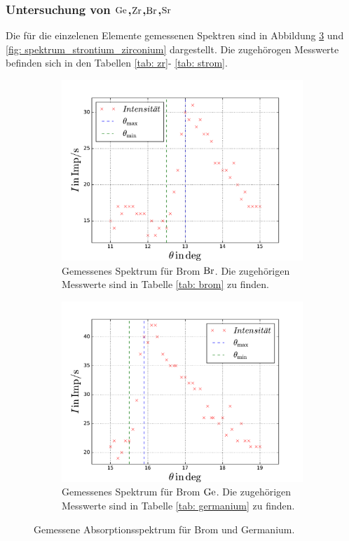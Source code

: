 \subsubsection{Untersuchung von $\ce{Ge}$,$\ce{Zr}$,$\ce{Br}$,$\ce{Sr}$}
Die für die einzelenen Elemente gemessenen Spektren sind in Abbildung \ref{fig: spektrum_brom_germanium} und
\ref{fig: spektrum_strontium_zirconium} dargestellt. Die zugehörogen Messwerte befinden sich in den Tabellen \ref{tab: zr}- \ref{tab: strom}.
\begin{figure}
  \centering
  \begin{subfigure}{0.48\textwidth}
    \centering
    \includegraphics[width=1 \textwidth]{../Messdaten/brom.pdf}
    \caption{Gemessenes Spektrum für Brom $\ce{Br}$. Die zugehörigen Messwerte sind in Tabelle \ref{tab: brom} zu finden.} %
    \label{fig: brom_spektrum}
  \end{subfigure}
  \begin{subfigure}{0.48\textwidth}
    \centering
    \includegraphics[width=1 \textwidth]{../Messdaten/germanium.pdf}
    \caption{Gemessenes Spektrum für Brom $\ce{Ge}$. Die zugehörigen Messwerte sind in Tabelle \ref{tab: germanium} zu finden.} %
    \label{fig: germaium_spektrum}
  \end{subfigure}
  \caption{Gemessene Absorptionsspektrum für Brom und Germanium.}
  \label{fig: spektrum_brom_germanium}
\end{figure}
